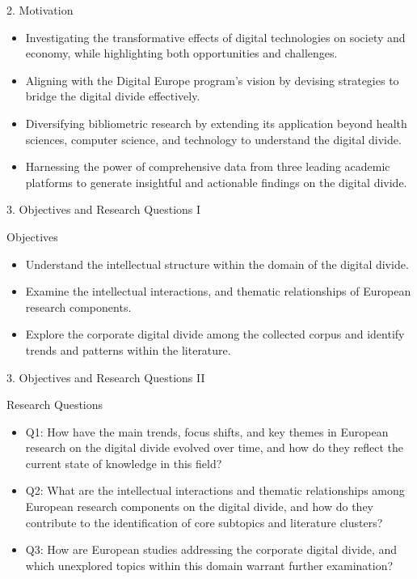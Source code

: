 \documentclass[
  ignorenonframetext,
]{beamer}
\begin{document}
\begin{frame}{2. Motivation}
\protect\hypertarget{motivation}{}
\begin{itemize}
\item
  Investigating the transformative effects of digital technologies on
  society and economy, while highlighting both opportunities and
  challenges.
\item
  Aligning with the Digital Europe program's vision by devising
  strategies to bridge the digital divide effectively.
\item
  Diversifying bibliometric research by extending its application beyond
  health sciences, computer science, and technology to understand the
  digital divide.
\item
  Harnessing the power of comprehensive data from three leading academic
  platforms to generate insightful and actionable findings on the
  digital divide.
\end{itemize}
\end{frame}

\begin{frame}{3. Objectives and Research Questions I}
\protect\hypertarget{objectives-and-research-questions-i}{}
\begin{block}{Objectives}
\protect\hypertarget{objectives}{}
\begin{itemize}
\item
  Understand the intellectual structure within the domain of the digital
  divide.
\item
  Examine the intellectual interactions, and thematic relationships of
  European research components.
\item
  Explore the corporate digital divide among the collected corpus and
  identify trends and patterns within the literature.
\end{itemize}
\end{block}
\end{frame}

\begin{frame}{3. Objectives and Research Questions II}
\protect\hypertarget{objectives-and-research-questions-ii}{}
\begin{block}{Research Questions}
\protect\hypertarget{research-questions}{}
\begin{itemize}
\item
  Q1: How have the main trends, focus shifts, and key themes in European
  research on the digital divide evolved over time, and how do they
  reflect the current state of knowledge in this field?
\item
  Q2: What are the intellectual interactions and thematic relationships
  among European research components on the digital divide, and how do
  they contribute to the identification of core subtopics and literature
  clusters?
\item
  Q3: How are European studies addressing the corporate digital divide,
  and which unexplored topics within this domain warrant further
  examination?
\end{itemize}
\end{block}
\end{frame}
\end{document}
